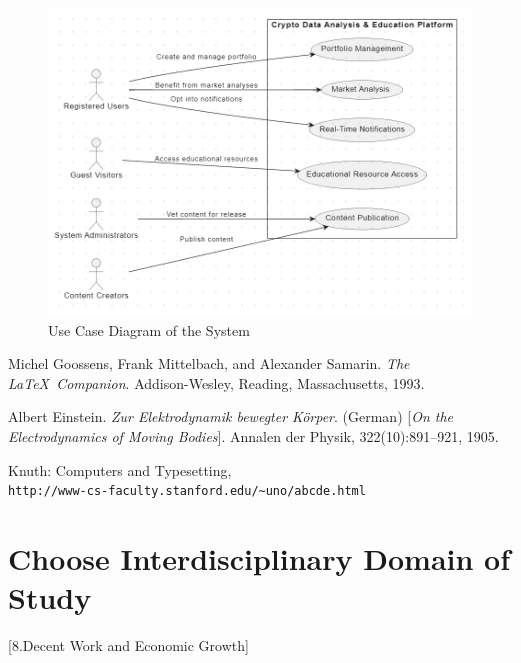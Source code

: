 \documentclass[12pt]{report}
\begin{document}
\clearpage %
\begin{figure}[p] %
\centering %
\includegraphics[width=\textwidth,height=\textheight,keepaspectratio]{use-case.png} %
\caption{Use Case Diagram of the System} %
\label{fig:er_diagram} %
\end{figure}
\clearpage %
\begin{thebibliography}{9}
Michel Goossens, Frank Mittelbach, and Alexander Samarin. 
\textit{The \LaTeX\ Companion}. 
Addison-Wesley, Reading, Massachusetts, 1993.
 
Albert Einstein. 
\textit{Zur Elektrodynamik bewegter K{\"o}rper}. (German) 
[\textit{On the Electrodynamics of Moving Bodies}]. 
Annalen der Physik, 322(10):891–921, 1905.
 
Knuth: Computers and Typesetting,
\\\texttt{http://www-cs-faculty.stanford.edu/\~{}uno/abcde.html}
\end{thebibliography}


\section{Choose Interdisciplinary Domain of Study}
[8.Decent Work and Economic Growth]
\end{document}
